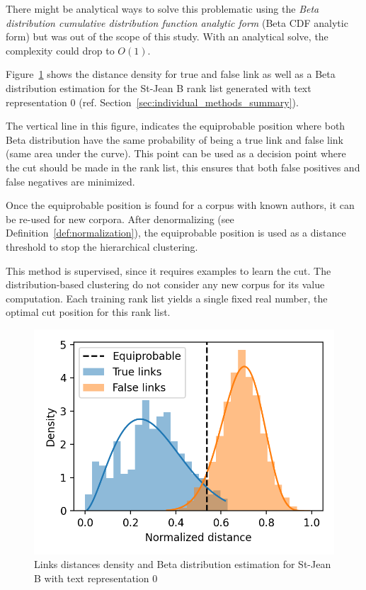 There might be analytical ways to solve this problematic using the \textit{Beta distribution cumulative distribution function analytic form} (Beta CDF analytic form) but was out of the scope of this study.
With an analytical solve, the complexity could drop to $O(1)$.

Figure~\ref{fig:links_score_density} shows the distance density for true and false link as well as a Beta distribution estimation for the St-Jean B rank list generated with text representation 0 (ref. Section~\ref{sec:individual_methods_summary}).

The vertical line in this figure, indicates the equiprobable position where both Beta distribution have the same probability of being a true link and false link (same area under the curve).
This point can be used as a decision point where the cut should be made in the rank list, this ensures that both false positives and false negatives are minimized.

Once the equiprobable position is found for a corpus with known authors, it can be re-used for new corpora.
After denormalizing (see Definition~\ref{def:normalization}), the equiprobable position is used as a distance threshold to stop the hierarchical clustering.

This method is supervised, since it requires examples to learn the cut.
The distribution-based clustering do not consider any new corpus for its value computation.
Each training rank list yields a single fixed real number, the optimal cut position for this rank list.

\begin{figure}
  \caption{Links distances density and Beta distribution estimation for St-Jean B with text representation 0}
  \label{fig:links_score_density}
  \includegraphics[width=\linewidth]{img/links_score_density.png}
\end{figure}

